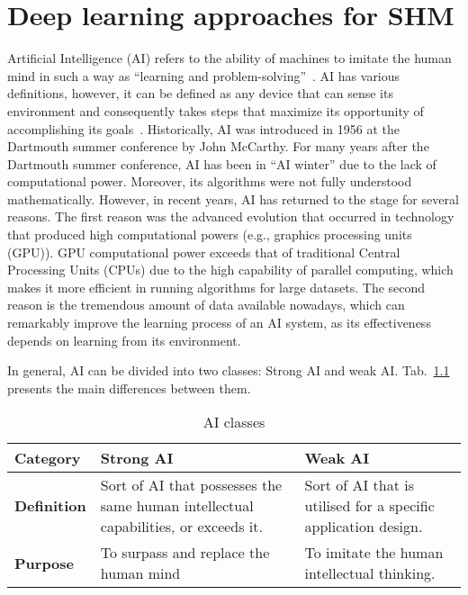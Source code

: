 \chapter[Deep learning for SHM]{Deep learning approaches for SHM}
\label{ch3}
Artificial Intelligence (AI) refers to the ability of machines to imitate the human mind in such a way as  \enquote{learning and problem-solving}~\cite{Russell2010}.
AI has various definitions, however, it can be defined as any device that can sense its environment and consequently takes steps that maximize its opportunity of accomplishing its goals~\cite{Russell2010}.
Historically, AI was introduced in 1956 at the Dartmouth summer conference by John McCarthy.
For many years after the Dartmouth summer conference, AI has been in \enquote{AI winter} due to the lack of computational power.
Moreover, its algorithms were not fully understood mathematically.
However, in recent years, AI has returned to the stage for several reasons.
The first reason was the advanced evolution that occurred in technology that produced high computational powers (e.g., graphics processing units (GPU)).
GPU computational power exceeds that of traditional Central Processing Units (CPUs) due to the high capability of parallel computing, which makes it more efficient in running algorithms for large datasets.
The second reason is the tremendous amount of data available nowadays, which can remarkably improve the learning process of an AI system, as its effectiveness depends on learning from its environment.

In general, AI can be divided into two classes: Strong AI and weak AI. Tab.~\ref{tab:Strong_Weak_AI} presents the main differences between them.
\begin{table}[h]
	\renewcommand{\arraystretch}{1.1}
	\centering
	\caption{AI classes}
	\scriptsize
	\begin{tabular}{p{2cm}p{4cm}p{4cm}} 
		\toprule
		\textbf{Category} & \textbf{Strong AI} & \textbf{Weak AI} \\ \midrule
		\textbf{Definition} & Sort of AI that possesses the same human intellectual capabilities, or exceeds it. & Sort of AI that is utilised for a specific application design. \\ \midrule
		
		\textbf{Purpose} &To surpass and replace the human mind  &  To imitate the human intellectual thinking. \\  
		\bottomrule
	\end{tabular}
	\label{tab:Strong_Weak_AI}
\end{table}

